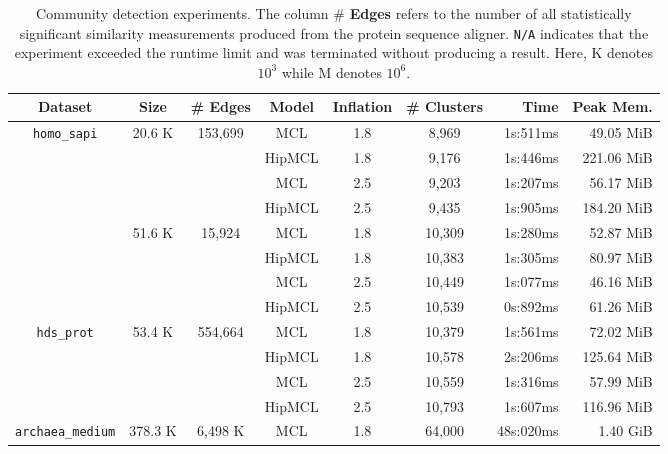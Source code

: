 \begin{table}[htbp]
  \footnotesize
  \hspace*{-5cm}
  \addtolength{\tabcolsep}{0pt}  %
  \centering
\caption{Community detection experiments. The column \# \textbf{Edges} refers to the number of all statistically significant similarity measurements produced from the protein sequence aligner. \texttt{N/A} indicates that the experiment exceeded the runtime limit and was terminated without producing a result. Here, K denotes \(10^3\) while M denotes \(10^6\).}
  \begin{tabular}{ccccccrr}
    \toprule
    \textbf{Dataset} & \textbf{Size} & \textbf{\# Edges} & \textbf{Model} & \textbf{Inflation} & \textbf{\# Clusters} & \textbf{Time} & \textbf{Peak Mem.}\\
    \midrule
    \multirow{4}{*}{\texttt{homo\_sapi}} & \multirow{4}{*}{20.6 K} & \multirow{4}{*}{153,699}
        & MCL    & 1.8 & 8,969 & 1s:511ms & 49.05 MiB \\
    & & & HipMCL & 1.8 & 9,176 & 1s:446ms & 221.06 MiB \\
    & & & MCL    & 2.5 & 9,203 & 1s:207ms & 56.17 MiB \\
    & & & HipMCL & 2.5 & 9,435 & 1s:905ms & 184.20 MiB \\
    \arrayrulecolor{gray!50}  %
    \midrule
    \multirow{4}{*}{\texttt{hac\_prot}} & \multirow{4}{*}{51.6 K} & \multirow{4}{*}{15,924}
        & MCL    & 1.8 & 10,309 & 1s:280ms & 52.87 MiB \\
    & & & HipMCL & 1.8 & 10,383 & 1s:305ms & 80.97 MiB \\
    & & & MCL    & 2.5 & 10,449 & 1s:077ms & 46.16 MiB \\
    & & & HipMCL & 2.5 & 10,539 & 0s:892ms & 61.26 MiB \\
    \midrule
    \multirow{4}{*}{\texttt{hds\_prot}} & \multirow{4}{*}{53.4 K} & \multirow{4}{*}{554,664}
        & MCL    & 1.8 & 10,379 & 1s:561ms & 72.02 MiB \\
    & & & HipMCL & 1.8 & 10,578 & 2s:206ms & 125.64 MiB \\
    & & & MCL    & 2.5 & 10,559 & 1s:316ms & 57.99 MiB \\
    & & & HipMCL & 2.5 & 10,793 & 1s:607ms & 116.96 MiB \\
    \midrule
    \multirow{4}{*}{\texttt{archaea\_medium}} & \multirow{4}{*}{378.3 K} & \multirow{4}{*}{6,498 K}
        & MCL    & 1.8 & 64,000 & 48s:020ms & 1.40 GiB \\

\end{tabular}
\end{table}
